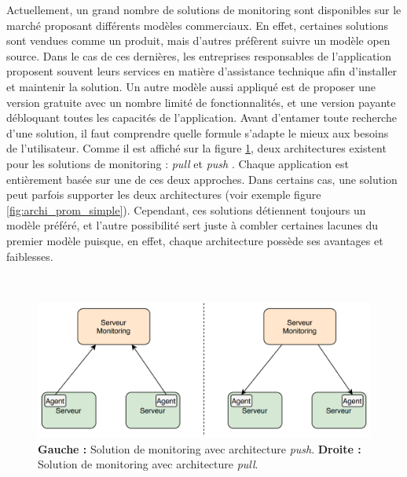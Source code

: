 \noindent
Actuellement, un grand nombre de solutions de monitoring sont disponibles sur le marché proposant différents modèles commerciaux. En effet, certaines solutions sont vendues comme un produit, mais d’autres préfèrent suivre un modèle open source. Dans le cas de ces dernières, les entreprises responsables de l’application proposent souvent leurs services en matière d’assistance technique afin d'installer et maintenir la solution. Un autre modèle aussi appliqué est de proposer une version gratuite avec un nombre limité de fonctionnalités, et une version payante débloquant toutes les capacités de l’application. Avant d’entamer toute recherche d’une solution, il faut comprendre quelle formule s’adapte le mieux aux besoins de l’utilisateur.
Comme il est affiché sur la figure \ref{fig:mon_archi}, deux architectures existent pour les solutions de monitoring : \textit{pull} et \textit{push} \cite{brazil2018prometheus, techhub_monitoring, blog_monitoring, techhub_monitoring}. Chaque application est entièrement basée sur une de ces deux approches. Dans certains cas, une solution peut parfois supporter les deux architectures (voir exemple figure \ref{fig:archi_prom_simple}). Cependant, ces solutions détiennent toujours un modèle préféré, et l’autre possibilité sert juste à combler certaines lacunes du premier modèle puisque, en effet, chaque architecture possède ses avantages et faiblesses.

~

\begin{figure}[ht!]
  \includegraphics[width=\textwidth]{img/state_of_the_art/monitoring_architecture.png}
  \caption{\textbf{Gauche :} Solution de monitoring avec architecture \textit{push}.  \textbf{Droite :} Solution de monitoring avec architecture \textit{pull}.}
  \label{fig:mon_archi}
\end{figure}



